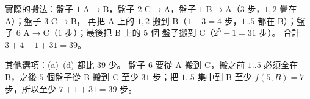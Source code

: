\begin{pastsoln}
實際的搬法：盤子 $1$ A$\to$B，盤子 $2$ C$\to$A，盤子 $1$ B$\to$A（$3$ 步，$1, 2$ 疊在 A）；盤子 $3$ C$\to$B，
再把 A 上的 $1, 2$ 搬到 B（$1 + 3 = 4$ 步，$1..5$ 都在 B）；盤子 $6$ A$\to$C（$1$ 步）；最後把 B 上的 $5$ 個
盤子搬到 C（$2^5 - 1 = 31$ 步）。 合計 $3 + 4 + 1 + 31 = 39$。

其他選項：(a)--(d) 都比 $39$ 少。 盤子 $6$ 要從 A 搬到 C，搬之前 $1..5$ 必須全在 B，之後 $5$ 個盤子從 B 搬到
C 至少 $31$ 步；把 $1..5$ 集中到 B 至少 $f(5, B) = 7$ 步，所以至少 $7 + 1 + 31 = 39$ 步。
\end{pastsoln}
